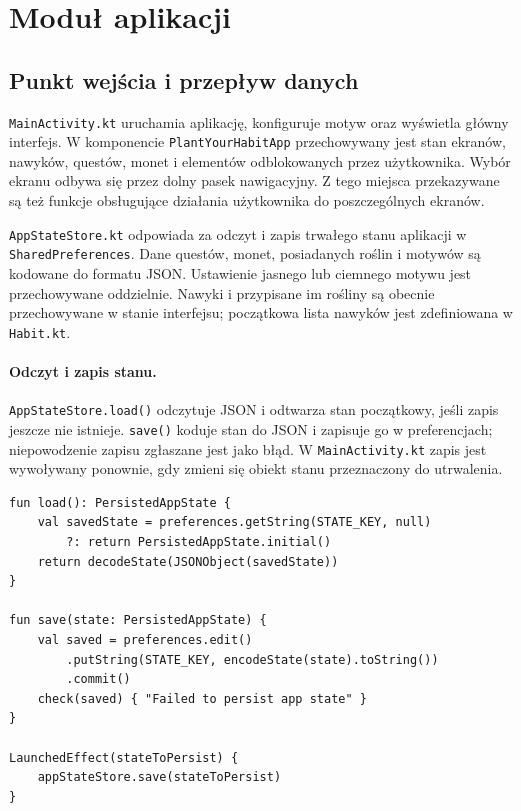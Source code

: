 \documentclass[a4paper,12pt]{article}
\begin{document}
\section{Moduł aplikacji}
\subsection{Punkt wejścia i przepływ danych}
\texttt{MainActivity.kt} uruchamia aplikację, konfiguruje motyw oraz wyświetla główny interfejs. W komponencie \texttt{PlantYourHabitApp} przechowywany jest stan ekranów, nawyków, questów, monet i elementów odblokowanych przez użytkownika. Wybór ekranu odbywa się przez dolny pasek nawigacyjny. Z tego miejsca przekazywane są też funkcje obsługujące działania użytkownika do poszczególnych ekranów.

\texttt{AppStateStore.kt} odpowiada za odczyt i zapis trwałego stanu aplikacji w \texttt{SharedPreferences}. Dane questów, monet, posiadanych roślin i motywów są kodowane do formatu JSON. Ustawienie jasnego lub ciemnego motywu jest przechowywane oddzielnie. Nawyki i przypisane im rośliny są obecnie przechowywane w stanie interfejsu; początkowa lista nawyków jest zdefiniowana w \texttt{Habit.kt}.

\paragraph{Odczyt i zapis stanu.}
\texttt{AppStateStore.load()} odczytuje JSON i odtwarza stan początkowy, jeśli zapis jeszcze nie istnieje. \texttt{save()} koduje stan do JSON i zapisuje go w preferencjach; niepowodzenie zapisu zgłaszane jest jako błąd. W \texttt{MainActivity.kt} zapis jest wywoływany ponownie, gdy zmieni się obiekt stanu przeznaczony do utrwalenia.

\begin{verbatim}
fun load(): PersistedAppState {
    val savedState = preferences.getString(STATE_KEY, null)
        ?: return PersistedAppState.initial()
    return decodeState(JSONObject(savedState))
}

fun save(state: PersistedAppState) {
    val saved = preferences.edit()
        .putString(STATE_KEY, encodeState(state).toString())
        .commit()
    check(saved) { "Failed to persist app state" }
}

LaunchedEffect(stateToPersist) {
    appStateStore.save(stateToPersist)
}
\end{verbatim}
\end{document}
